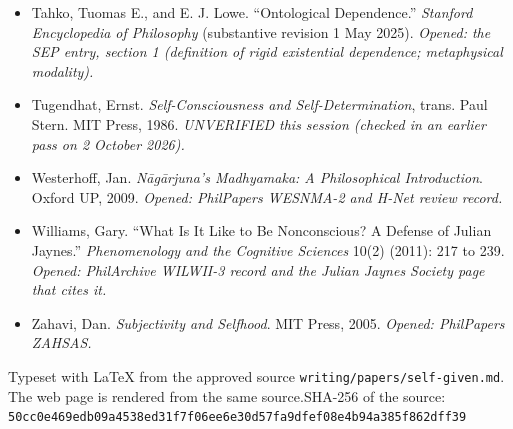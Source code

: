 \documentclass[11pt]{article}
\begin{document}
\begin{itemize}
\item Tahko, Tuomas E., and E. J. Lowe. ``Ontological Dependence.'' \emph{Stanford Encyclopedia of Philosophy} (substantive revision 1 May 2025). \emph{Opened: the SEP entry, section 1 (definition of rigid existential dependence; metaphysical modality).}
\item Tugendhat, Ernst. \emph{Self-Consciousness and Self-Determination}, trans. Paul Stern. MIT Press, 1986. \emph{UNVERIFIED this session (checked in an earlier pass on 2 October 2026).}
\item Westerhoff, Jan. \emph{Nāgārjuna's Madhyamaka: A Philosophical Introduction}. Oxford UP, 2009. \emph{Opened: PhilPapers WESNMA-2 and H-Net review record.}
\item Williams, Gary. ``What Is It Like to Be Nonconscious? A Defense of Julian Jaynes.'' \emph{Phenomenology and the Cognitive Sciences} 10(2) (2011): 217 to 239. \emph{Opened: PhilArchive WILWII-3 record and the Julian Jaynes Society page that cites it.}
\item Zahavi, Dan. \emph{Subjectivity and Selfhood}. MIT Press, 2005. \emph{Opened: PhilPapers ZAHSAS.}
\end{itemize}
\vfill{\footnotesize Typeset with LaTeX from the approved source \texttt{writing/papers/self-given.md}. The web page is rendered from the same source.\newline SHA-256 of the source: \texttt{50cc0e469edb09a4538ed31f7f06ee6e30d57fa9dfef08e4b94a385f862dff39}\par}
\end{document}
